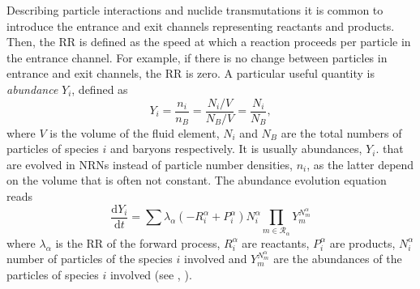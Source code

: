 Describing particle interactions and nuclide transmutations it is common to introduce the entrance 
and exit channels representing reactants and products. Then, the \ac{RR} is defined as the speed 
at which a reaction proceeds per particle in the entrance channel. 
For example, if there is no change between particles in entrance and exit channels, the \ac{RR} is zero. 
%
A particular useful quantity is \textit{abundance} $Y_i$, defined as 
%
\begin{equation}
\label{eq:theory:nuc:abundance}
Y_i = \frac{n_i}{n_B} = \frac{N_i/V}{N_B/V} = \frac{N_i}{N_B},
\end{equation}
%
where $V$ is the volume of the fluid element, $N_i$ and $N_B$ are the total numbers of particles 
of species $i$ and baryons respectively. 
It is usually abundances, $Y_i$. that are evolved in \acp{NRN} instead of 
particle number densities, $n_i$, as the latter depend on the volume that is often not constant. 
%
The abundance evolution equation reads
%
\begin{equation}
\frac{\text{d}Y_i}{\text{d}t} = \sum\lambda_{\alpha}(-R_{i}^{\alpha}+P_{i}^{\alpha})N_{i}^{\alpha}\prod_{m\in\mathcal{R}_{\alpha}}Y_m^{N_{m}^{\alpha}}
\end{equation}
%
where $\lambda_{\alpha}$ is the \ac{RR} of the forward process, $R_{i}^{\alpha}$ are reactants, 
$P_{i}^{\alpha}$ are products, $N_{i}^{\alpha}$ number of particles of the species $i$ involved 
and $Y_m^{N_{m}^{\alpha}}$ are the abundances of the particles of species $i$ involved 
(see \eg, \citet{Hix:1999}).

